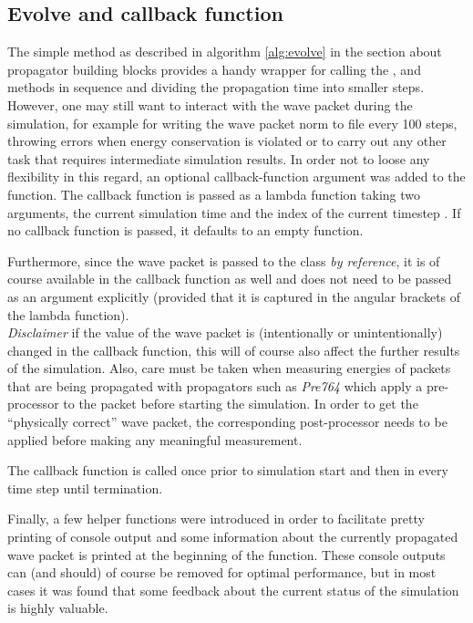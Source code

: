 \subsection{Evolve and callback function}
\label{subsec:callback}
%
The simple  method as described in algorithm \ref{alg:evolve} in the section about propagator building blocks provides a handy wrapper for calling the ,  and  methods in sequence and dividing the propagation time into smaller steps. \\
%
However, one may still want to interact with the wave packet during the simulation, for example for writing the wave packet norm to file every 100 steps, throwing errors when energy conservation is violated or to carry out any other task that requires intermediate simulation results.
In order not to loose any flexibility in this regard, an optional callback-function argument was added to the  function.
The callback function is passed as a lambda function taking two arguments, the current simulation time  and the index of the current timestep .
If no callback function is passed, it defaults to an empty function.
\par\medskip
%
Furthermore, since the wave packet is passed to the  class \emph{by reference}, it is of course available in the callback function as well and does not need to be passed as an argument explicitly (provided that it is captured in the angular brackets \proc{[]} of the lambda function). \\
\emph{Disclaimer} if the value of the wave packet is (intentionally or unintentionally) changed in the callback function, this will of course also affect the further results of the simulation.
Also, care must be taken when measuring energies of packets that are being propagated with propagators such as \emph{Pre764} which apply a pre-processor to the packet before starting the simulation.
In order to get the ``physically correct'' wave packet, the corresponding post-processor needs to be applied before making any meaningful measurement.
\par\medskip
%
The callback function is called once prior to simulation start and then in every time step until termination.
\par\medskip
%
Finally, a few helper functions were introduced in order to facilitate pretty printing of console output and some information about the currently propagated wave packet is printed at the beginning of the  function.
These console outputs can (and should) of course be removed for optimal performance, but in most cases it was found that some feedback about the current status of the simulation is highly valuable.


